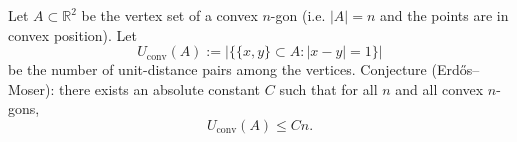 Let $A\subset\mathbb{R}^2$ be the vertex set of a convex $n$-gon (i.e. $|A|=n$ and the points are in convex position).
Let
\[
U_\mathrm{conv}(A):=|\{\{x,y\}\subset A: |x-y|=1\}|
\]
be the number of unit-distance pairs among the vertices.
Conjecture (Erd\H{o}s--Moser): there exists an absolute constant $C$ such that for all $n$ and all convex $n$-gons,
\[
U_\mathrm{conv}(A)\le Cn.
\]
